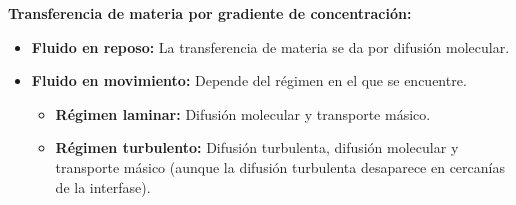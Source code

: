\documentclass{report}
\begin{document}
\begin{raggedright}
\textbf{Transferencia de materia por gradiente de concentración:}
\begin{itemize}
    \item \textbf{Fluido en reposo:} La transferencia de materia se da por difusión molecular.
    \item \textbf{Fluido en movimiento:} Depende del régimen en el que se encuentre.
    \begin{itemize}
        \item \textbf{Régimen laminar:} Difusión molecular y transporte másico.
        \item \textbf{Régimen turbulento:} Difusión turbulenta, difusión molecular y transporte másico 
              (aunque la difusión turbulenta desaparece en cercanías de la interfase).
    \end{itemize}
\end{itemize}
\end{raggedright}
\end{document}
